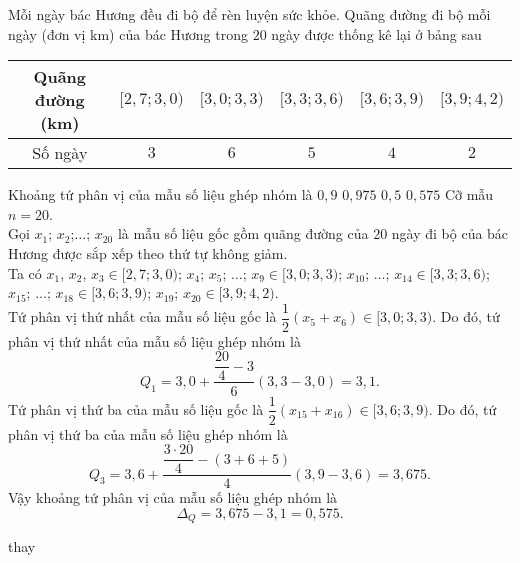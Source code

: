 \begin{ex}%
	Mỗi ngày bác Hương đều đi bộ để rèn luyện sức khỏe. Quãng đường đi bộ mỗi ngày (đơn vị km) của bác Hương trong $20$ ngày được thống kê lại ở bảng sau
	\begin{center}
		\begin{tabular}{|c|c|c|c|c|c|}
			\hline
			Quãng đường (km) & $[2{,}7;3{,}0)$ & $[3{,}0;3{,}3)$ & $[3{,}3;3{,}6)$ & $[3{,}6;3{,}9)$ & $[3{,}9;4{,}2)$ \\
			\hline
			Số ngày          & $3$             & $6$             & $5$             & $4$             & $2$             \\
			\hline
		\end{tabular}
	\end{center}
	Khoảng tứ phân vị của mẫu số liệu ghép nhóm là
	\choice
	{$0{,}9$}
	{$0{,}975$}
	{$0{,}5$}
	{\True $0{,}575$}
	\loigiai
	{
	Cỡ mẫu $n=20$.\\
	Gọi $x_1$; $x_2$;$\ldots$; $x_{20}$ là mẫu số liệu gốc gồm quãng đường của $20$ ngày đi bộ của bác Hương được sắp xếp theo thứ tự không giảm.\\
	Ta có $x_1$, $x_2$, $x_3\in [2{,}7;3{,}0)$; $x_4$; $x_5$; $\ldots$; $x_9\in [3{,}0;3{,}3)$; $x_{10}$; $\ldots$; $x_{14}\in [3{,}3;3{,}6)$; \break$x_{15}$; $\ldots$; $x_{18}\in [3{,}6;3{,}9)$; $x_{19}$; $x_{20}\in [3{,}9;4{,}2)$.\\
	Tứ phân vị thứ nhất của mẫu số liệu gốc là $\dfrac{1}{2}(x_5+x_6)\in [3{,}0;3{,}3)$. Do đó, tứ phân vị thứ nhất của mẫu số liệu ghép nhóm là
	\[Q_1=3{,}0+\dfrac{\dfrac{20}{4}-3}{6}(3{,}3-3{,}0)=3{,}1.\]
	Tứ phân vị thứ ba của mẫu số liệu gốc là $\dfrac{1}{2}(x_{15}+x_{16})\in [3{,}6;3{,}9)$. Do đó, tứ phân vị thứ ba của mẫu số liệu ghép nhóm là
	\[Q_3=3{,}6+\dfrac{\dfrac{3\cdot 20}{4}-(3+6+5)}{4}(3{,}9-3{,}6)=3{,}675.\]
	Vậy khoảng tứ phân vị của mẫu số liệu ghép nhóm là
	\[\Delta_Q=3{,}675-3{,}1=0{,}575.\]
	}
\end{ex}

\begin{ex}%
	thay
\end{ex}

